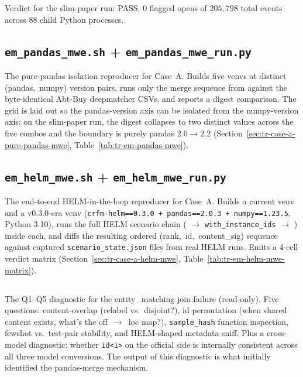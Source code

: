 \documentclass[11pt]{article}
\begin{document}
Verdict for the slim-paper run: PASS, $0$ flagged opens of
  $205{,}798$ total events across $88$ child Python processes.

\subsection{\texorpdfstring{\texttt{em\_pandas\_mwe.sh} + \texttt{em\_pandas\_mwe\_run.py}}{em\_pandas\_mwe.sh + em\_pandas\_mwe\_run.py}}
\label{sec:tr-tooling-em-pandas-mwe}

The pure-pandas isolation reproducer for Case~A.
Builds five venvs at distinct \mbox{(pandas, numpy)} version pairs,
  runs only the merge sequence from
   against the
  byte-identical Abt-Buy deepmatcher CSVs, and reports a digest
  comparison.
The grid is laid out so the pandas-version axis can be isolated from
  the numpy-version axis; on the slim-paper run, the digest collapses
  to two distinct values across the five combos and the boundary is
  purely pandas $2.0 \to 2.2$
  (Section~\ref{sec:tr-case-a-pure-pandas-mwe},
  Table~\ref{tab:tr-em-pandas-mwe}).

\subsection{\texorpdfstring{\texttt{em\_helm\_mwe.sh} + \texttt{em\_helm\_mwe\_run.py}}{em\_helm\_mwe.sh + em\_helm\_mwe\_run.py}}
\label{sec:tr-tooling-em-helm-mwe}

The end-to-end HELM-in-the-loop reproducer for Case~A.
Builds a current venv and a v0.3.0-era venv
  (\texttt{crfm-helm==0.3.0 + pandas==2.0.3 + numpy==1.23.5},
  Python 3.10), runs the full HELM scenario chain
  ( $\to$
  \texttt{with\_instance\_ids} $\to$
  ) inside each, and diffs the
  resulting ordered \mbox{(rank, id, content\_sig)} sequence against
  captured \texttt{scenario\_state.json} files from real HELM runs.
Emits a 4-cell verdict matrix
  (Section~\ref{sec:tr-case-a-helm-mwe},
  Table~\ref{tab:tr-em-helm-mwe-matrix}).

\subsection{\texorpdfstring{}{diagnose\_entity\_matching\_join.py}}
\label{sec:tr-tooling-em-diagnose}

The Q1--Q5 diagnostic for the entity\_matching join failure
  (read-only).
Five questions: content-overlap (relabel vs.\ disjoint?), id
  permutation (when shared content exists, what's the off~$\to$~loc
  map?), \texttt{sample\_hash} function inspection, fewshot vs.\
  test-pair stability, and HELM-shaped metadata sniff.
Plus a cross-model diagnostic: whether \texttt{id<i>} on the
  official side is internally consistent across all three model
  conversions.
The output of this diagnostic is what initially identified the
  pandas-merge mechanism.
\end{document}
